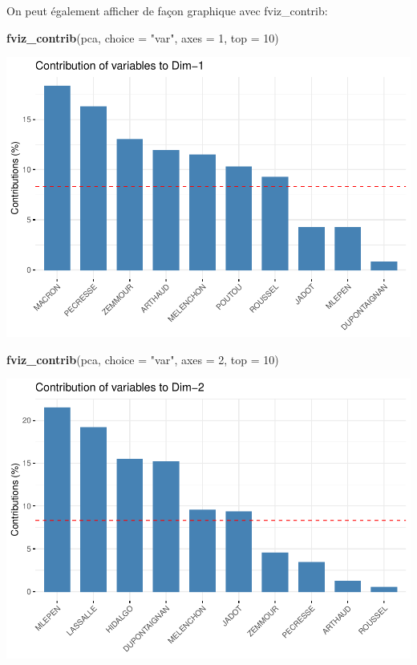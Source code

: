 \documentclass[
]{book}
\newenvironment{Shaded}{\begin{snugshade}}{\end{snugshade}}
\newcommand{\AttributeTok}[1]{\textcolor[rgb]{0.13,0.29,0.53}{#1}}
\newcommand{\DecValTok}[1]{\textcolor[rgb]{0.00,0.00,0.81}{#1}}
\newcommand{\FunctionTok}[1]{\textcolor[rgb]{0.13,0.29,0.53}{\textbf{#1}}}
\newcommand{\NormalTok}[1]{#1}
\newcommand{\StringTok}[1]{\textcolor[rgb]{0.31,0.60,0.02}{#1}}
\begin{document}
On peut également afficher de façon graphique avec fviz\_contrib:

\begin{Shaded}
\begin{Highlighting}[]
\FunctionTok{fviz\_contrib}\NormalTok{(pca, }\AttributeTok{choice =} \StringTok{"var"}\NormalTok{, }\AttributeTok{axes =} \DecValTok{1}\NormalTok{, }\AttributeTok{top =} \DecValTok{10}\NormalTok{)}
\end{Highlighting}
\end{Shaded}

\includegraphics{bookdown-demo_files/figure-latex/unnamed-chunk-69-1.pdf}

\begin{Shaded}
\begin{Highlighting}[]
\FunctionTok{fviz\_contrib}\NormalTok{(pca, }\AttributeTok{choice =} \StringTok{"var"}\NormalTok{, }\AttributeTok{axes =} \DecValTok{2}\NormalTok{, }\AttributeTok{top =} \DecValTok{10}\NormalTok{)}
\end{Highlighting}
\end{Shaded}

\includegraphics{bookdown-demo_files/figure-latex/unnamed-chunk-69-2.pdf}
\end{document}
